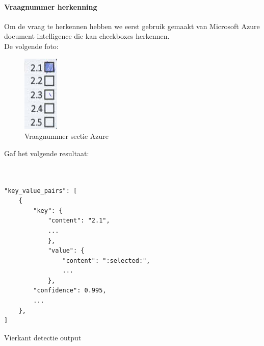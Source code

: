 \documentclass[12pt]{article}
\begin{document}
\begin{multicols}{2}
\paragraph*{Vraagnummer herkenning} Om de vraag te herkennen hebben we eerst gebruik gemaakt van Microsoft Azure document intelligence die kan checkboxes herkennen.\\
De volgende foto:
\begin{figure}[H]
    \centering
    \includegraphics[width=0.2\linewidth]{./images/methoden/inscannen/sectie/checkbox/vraagnummer/answer_section.png}
    \caption{Vraagnummer sectie Azure}
    \label{fig:sec-azure}
\end{figure}
Gaf het volgende resultaat: 
\begin{listing}[H]
\begin{verbatim}


"key_value_pairs": [
    {
        "key": {
            "content": "2.1",
            ...
            },
            "value": {
                "content": ":selected:",
                ...
            },
        "confidence": 0.995,
        ...
    },
]

\end{verbatim}
\caption{Vierkant detectie output} 
\label{json-example}
\end{listing}


\end{multicols}
\end{document}
